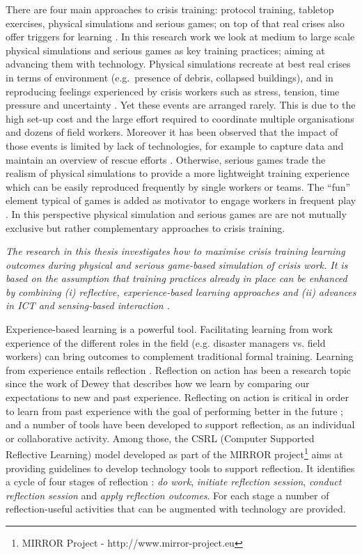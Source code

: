 There are four main approaches to crisis training: protocol training, tabletop exercises, physical simulations and serious games; on top of that real crises also offer triggers for learning \autocite{Deverell:2009fk}. In this research work we look at medium to large scale physical simulations and serious games as key training practices; aiming at advancing them with technology. Physical simulations recreate at best real crises in terms of environment (e.g.~presence of debris, collapsed buildings), and in reproducing feelings experienced by crisis workers such as stress, tension, time pressure and uncertainty \autocite{Borodzicz:2002em}. Yet these events are arranged rarely. This is due to the high set-up cost and the large effort required to coordinate multiple organisations and dozens of field workers. Moreover it has been observed that the impact of those events is limited by lack of technologies, for example to capture data and maintain an overview of rescue efforts \autocite{Kyng:2006he}. Otherwise, serious games trade the realism of physical simulations to provide a more lightweight training experience which can be easily reproduced frequently by single workers or teams. The ``fun'' element typical of games is added as motivator to engage workers in frequent play \autocite{DiLoreto:2012jj}. In this perspective physical simulation and serious games are are not mutually exclusive but rather complementary approaches to crisis training.

\emph{The research in this thesis investigates how to maximise crisis training learning outcomes during physical and serious game-based simulation of crisis work. It is based on the assumption that training practices already in place can be enhanced by combining (i) reflective, experience-based learning approaches and (ii) advances in ICT and sensing-based interaction \autocite{Zhai:2005jm}.}

Experience-based learning is a powerful tool. Facilitating learning from work experience of the different roles in the field (e.g. disaster managers vs. field workers) can bring outcomes to complement traditional formal training. Learning from experience entails reflection \autocites{boud1985reflection}{Dewey:1998ug}{kolb1974toward}. Reflection on action has been a research topic since the work of Dewey \autocite{dewey1933we} that describes how we learn by comparing our expectations to new and past experience. Reflecting on action is critical in order to learn from past experience with the goal of performing better in the future \autocites{boud1985reflection}{Schon:1983ut}; and a number of tools have been developed to support reflection, as an individual or collaborative activity. Among those, the CSRL (Computer Supported Reflective Learning) model developed as part of the MIRROR project\footnote{MIRROR Project - http://www.mirror-project.eu} aims at providing guidelines to develop technology tools to support reflection. It identifies a cycle of four stages of reflection \autocite{Krogstie:2013kf}: \emph{do work}, \emph{initiate reflection session}, \emph{conduct reflection session} and \emph{apply reflection outcomes}. For each stage a number of reflection-useful activities that can be augmented with technology are provided.

